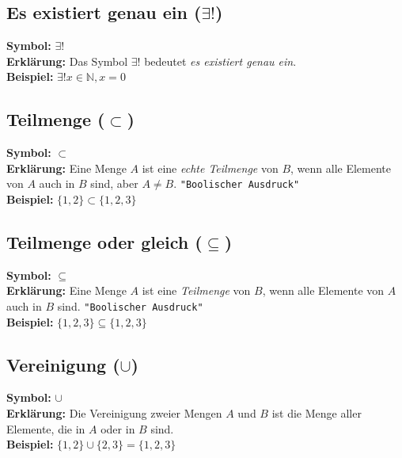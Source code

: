 \documentclass[12pt,a4paper]{article}
\begin{document}
\subsection{Es existiert genau ein (\texorpdfstring{$\exists !$}{exists!})}
\textbf{Symbol:} $\exists !$ \\
\textbf{Erklärung:} Das Symbol $\exists !$ bedeutet \textit{es existiert genau ein}. \\
\textbf{Beispiel:} $\exists ! x \in \mathbb{N}, x = 0$

\subsection{Teilmenge (\texorpdfstring{$\subset$}{subset})}
\textbf{Symbol:} $\subset$ \\
\textbf{Erklärung:} Eine Menge $A$ ist eine \emph{echte Teilmenge} von $B$, wenn alle Elemente von $A$ auch in $B$ sind, aber $A \neq B$. \texttt{"Boolischer Ausdruck"} \\
\textbf{Beispiel:} $\{1,2\} \subset \{1,2,3\}$

\subsection{Teilmenge oder gleich (\texorpdfstring{$\subseteq$}{subseteq})}
\textbf{Symbol:} $\subseteq$ \\
\textbf{Erklärung:} Eine Menge $A$ ist eine \emph{Teilmenge} von $B$, wenn alle Elemente von $A$ auch in $B$ sind. \texttt{"Boolischer Ausdruck"} \\
\textbf{Beispiel:} $\{1,2,3\} \subseteq \{1,2,3\}$

\subsection{Vereinigung (\texorpdfstring{$\cup$}{cup})}
\textbf{Symbol:} $\cup$ \\
\textbf{Erklärung:} Die Vereinigung zweier Mengen $A$ und $B$ ist die Menge aller Elemente, die in $A$ oder in $B$ sind. \\
\textbf{Beispiel:} $\{1,2\} \cup \{2,3\} = \{1,2,3\}$
\begin{center}
\end{center}
\end{document}
